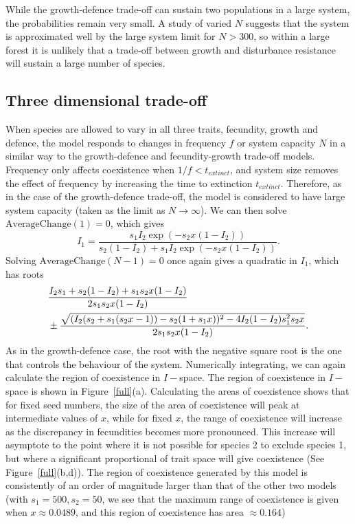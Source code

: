 \documentclass[preprint,10pt,reqno]{amsart}
\begin{document}
While the growth-defence trade-off can sustain two populations in a large system, the probabilities remain very small. A study of varied $N$ suggests that the system is approximated well by the large system limit for $N>300$, so within a large forest it is unlikely that a trade-off between growth and disturbance resistance will sustain a large number of species. 

\subsection{Three dimensional trade-off}
When species are allowed to vary in all three traits, fecundity, growth and defence, the model responds to changes in frequency $f$ or system capacity $N$ in a similar way to the growth-defence and fecundity-growth trade-off models. Frequency only affects coexistence when $1/f<t_{extinct}$, and system size removes the effect of frequency by increasing the time to extinction $t_{extinct}$. Therefore, as in the case of the growth-defence trade-off,  the model is considered to have large system capacity (taken as the limit as $N \to \infty$). We can then solve $\text{AverageChange}(1)=0$, which gives
\begin{equation}
\label{fullac1sol}
I_1=\frac{s_1I_2\exp(-s_2x(1-I_2))}{s_2(1-I_2)+s_1I_2\exp(-s_2x(1-I_2))}.
\end{equation}
Solving $\text{AverageChange}(N-1)=0$ once again gives a quadratic in $I_1$, which has roots
\begin{align}
\label{fullacnsol}
&\frac{I_2s_1+s_2(1-I_2)+s_1s_2x(1-I_2)}{2s_1s_2x(1-I_2)} \notag \\ &\pm \frac{\sqrt{(I_2(s_2+s_1(s_2x-1))-s_2(1+s_1x))^2-4I_2(1-I_2)s_1^2s_2x}}{2s_1s_2x(1-I_2)}.
\end{align}
As in the growth-defence case, the root with the negative square root is the one that controls the behaviour of the system. Numerically integrating, we can again calculate the region of coexistence in $I-$space. The region of coexistence in $I-$space is shown in Figure~\ref{full}(a). Calculating the areas of coexistence shows that for fixed seed numbers, the size of the area of coexistence will peak at intermediate values of $x$, while for fixed $x$, the range of coexistence will increase as the discrepancy in fecundities becomes more pronounced. This increase will asymptote to the point where it is not possible for species 2 to exclude species 1, but where a significant proportional of trait space will give coexistence (See Figure~\ref{full}(b,d)). The region of coexistence generated by this model is consistently of an order of magnitude larger than that of the other two models (with $s_1=500,s_2=50$, we see that the maximum range of coexistence is given when $x\approx 0.0489$, and this region of coexistence has area $\approx 0.164$)
\end{document}
